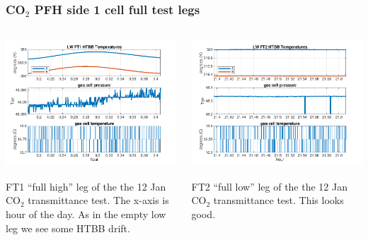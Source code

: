 \documentclass[10pt]{beamer}
\begin{document}
\begin{frame}
\frametitle{CO$_2$ PFH side 1 cell full test legs}
\begin{columns}[t]
\begin{column}{0.5\textwidth}
  \begin{centering}
  \includegraphics[width=\textwidth]{harvest_01-12/01-12_LW_FT1.png}
  \end{centering}\vspace{3mm}

  FT1 ``full high'' leg of the the 12 Jan CO$_2$ transmittance test.
  The x-axis is hour of the day.  As in the empty low leg we see
  some HTBB drift.

\end{column}
\begin{column}{0.5\textwidth}  
  \begin{centering}
  \includegraphics[width=\textwidth]{harvest_01-12/01-12_LW_FT2.png}
  \end{centering}\vspace{3mm}

  FT2 ``full low'' leg of the the 12 Jan CO$_2$ transmittance test.
  This looks good.

\end{column}
\end{columns}
\end{frame}
\end{document}
